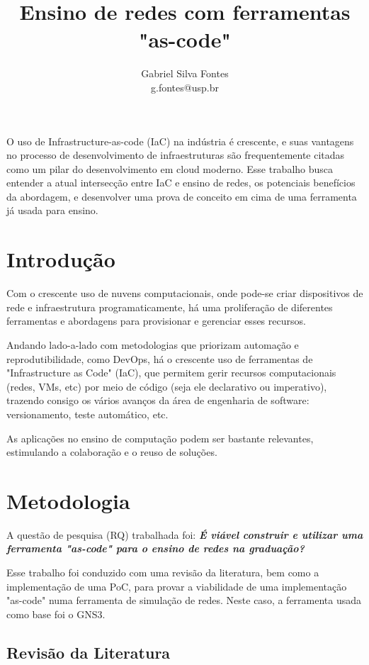 \documentclass[12pt]{article}
\title{Ensino de redes com ferramentas "as-code"}
\author{Gabriel Silva Fontes\inst{1} \\ g.fontes@usp.br}
\begin{document}
\maketitle

\begin{resumo}
    O uso de Infrastructure-as-code (IaC) na indústria é crescente, e suas
    vantagens no processo de desenvolvimento de infraestruturas são
    frequentemente citadas como um pilar do desenvolvimento em cloud moderno.
    Esse trabalho busca entender a atual intersecção entre IaC e ensino de
    redes, os potenciais benefícios da abordagem, e desenvolver uma prova de
    conceito em cima de uma ferramenta já usada para ensino.
\end{resumo}

\section{Introdução}

Com o crescente uso de nuvens computacionais, onde pode-se criar dispositivos
de rede e infraestrutura programaticamente, há uma proliferação de diferentes
ferramentas e abordagens para provisionar e gerenciar esses recursos.

Andando lado-a-lado com metodologias que priorizam automação e
reprodutibilidade, como DevOps, há o crescente uso de ferramentas de
"Infrastructure as Code" (IaC), que permitem gerir recursos computacionais
(redes, VMs, etc) por meio de código (seja ele declarativo ou imperativo),
trazendo consigo os vários avanços da área de engenharia de software:
versionamento, teste automático, etc.

As aplicações no ensino de computação podem ser bastante relevantes,
estimulando a colaboração e o reuso de soluções.

\section{Metodologia}

A questão de pesquisa (RQ) trabalhada foi: \textbf{\textit{É viável construir e
utilizar uma ferramenta "as-code" para o ensino de redes na graduação?}}

Esse trabalho foi conduzido com uma revisão da literatura, bem como a
implementação de uma PoC, para provar a viabilidade de uma implementação
"as-code" numa ferramenta de simulação de redes. Neste caso, a ferramenta usada
como base foi o GNS3.

\subsection{Revisão da Literatura}
\end{document}
